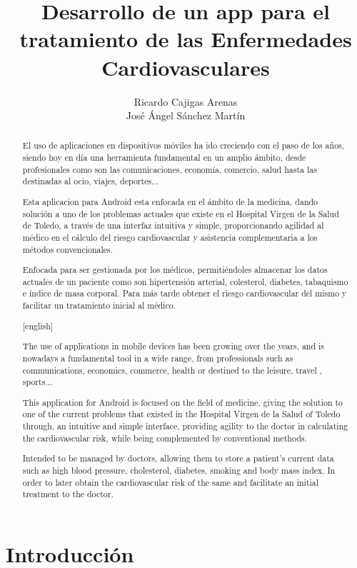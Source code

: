 \documentclass[11pt,spanish,
		listoftables,listoffigures]
		{tfgplantilla}
\title{Desarrollo de un app para el \\
         tratamiento de las Enfermedades Cardiovasculares}
\author{Ricardo Cajigas Arenas \\ José Ángel Sánchez Martín}
\begin{document}
\begin{abstract}
\setcounter{page}{1}
El uso de aplicaciones en dispositívos móviles ha ido creciendo con el paso de los años, siendo hoy en día una herramienta fundamental en un amplio ámbito, desde profesionales como son las comunicaciones, economía, comercio, salud hasta las destinadas al ocio, viajes, deportes...

Esta aplicacion para Android esta enfocada en el ámbito de la medicina, dando solución a uno de los problemas actuales que existe en el  Hospital Virgen de la Salud de Toledo, a través de una interfaz intuitiva y simple, proporcionando agilidad al médico en el cálculo del riesgo cardiovascular y asistencia complementaria a los métodos convencionales.

Enfocada para ser gestionada por los médicos, permitiéndoles almacenar los datos actuales de un paciente como son hipertensión arterial, colesterol, diabetes, tabaquismo e índice de masa corporal. Para más tarde obtener el riesgo cardiovascular del mismo y facilitar un tratamiento inicial al médico.
\end{abstract}

\begin{abstract}[english]
The use of applications in mobile devices has been growing over the years, and is nowadays a fundamental tool in a wide range, from professionals such as communications, economics, commerce, health or destined to the leisure, travel , sports...

This application for Android is focused on the field of medicine, giving the solution to one of the current problems that existed in the Hospital Virgen de la Salud of Toledo through, an intuitive and simple interface, providing agility to the doctor in calculating the cardiovascular risk, while being complemented by conventional methods.

Intended to be managed by doctors, allowing them to store a patient's current data such as high blood pressure, cholesterol, diabetes, smoking and body mass index. In order to later obtain the cardiovascular risk of the same and facilitate an initial treatment to the doctor.
\end{abstract}

\mainmatter


\chapter{Introducci\'on}
\end{document}
